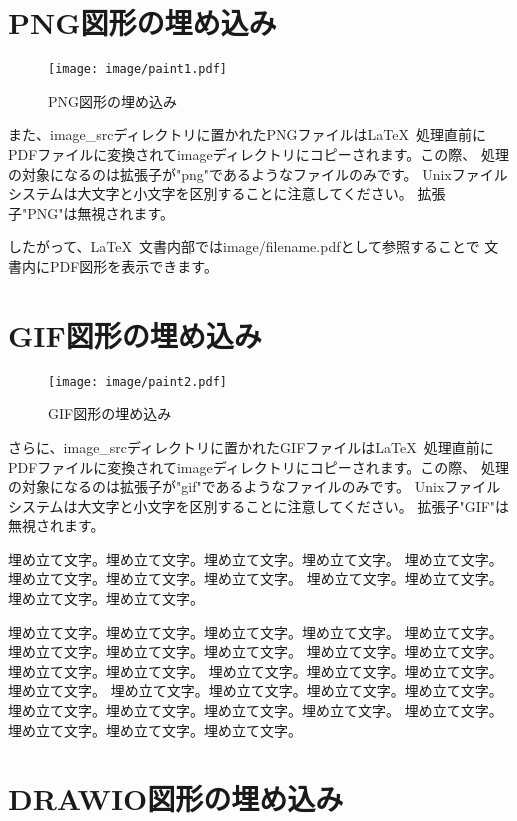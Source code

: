 \section{PNG図形の埋め込み}

\begin{wrapfigure}[10]{O}[0pt]{0\textwidth}
  \texttt{[image: image/paint1.pdf]}
  \caption{PNG図形の埋め込み}\label{embeded_png}
\end{wrapfigure}

また、image\_srcディレクトリに置かれたPNGファイルは\LaTeX\
処理直前にPDFファイルに変換されてimageディレクトリにコピーされます。この際、
処理の対象になるのは拡張子が"png"であるようなファイルのみです。
Unixファイルシステムは大文字と小文字を区別することに注意してください。
拡張子"PNG"は無視されます。

したがって、\LaTeX\ 文書内部ではimage/filename.pdfとして参照することで
文書内にPDF図形を表示できます。

\section{GIF図形の埋め込み}

\begin{wrapfigure}[10]{O}[0pt]{0\textwidth}
  \texttt{[image: image/paint2.pdf]}
  \caption{GIF図形の埋め込み}\label{embeded_gif}
\end{wrapfigure}

さらに、image\_srcディレクトリに置かれたGIFファイルは\LaTeX\
処理直前にPDFファイルに変換されてimageディレクトリにコピーされます。この際、
処理の対象になるのは拡張子が"gif"であるようなファイルのみです。
Unixファイルシステムは大文字と小文字を区別することに注意してください。
拡張子"GIF"は無視されます。

埋め立て文字。埋め立て文字。埋め立て文字。埋め立て文字。
埋め立て文字。埋め立て文字。埋め立て文字。埋め立て文字。
埋め立て文字。埋め立て文字。埋め立て文字。埋め立て文字。

埋め立て文字。埋め立て文字。埋め立て文字。埋め立て文字。
埋め立て文字。埋め立て文字。埋め立て文字。埋め立て文字。
埋め立て文字。埋め立て文字。埋め立て文字。埋め立て文字。
埋め立て文字。埋め立て文字。埋め立て文字。埋め立て文字。
埋め立て文字。埋め立て文字。埋め立て文字。埋め立て文字。
埋め立て文字。埋め立て文字。埋め立て文字。埋め立て文字。
埋め立て文字。埋め立て文字。埋め立て文字。埋め立て文字。


\section{DRAWIO図形の埋め込み}

